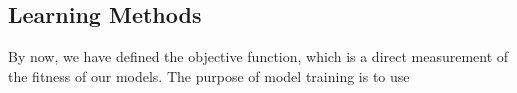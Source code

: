 \subsection {Learning Methods}
By now, we have defined the objective function, which is a direct measurement of the fitness of our models. The purpose of model training is to use 